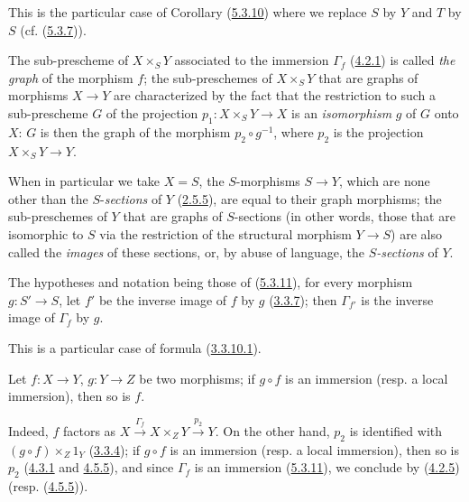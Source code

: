 This is the particular case of Corollary (\hyperref[I.5.3.10]{5.3.10})
where we replace $S$ by $Y$ and $T$ by $S$
(cf. (\hyperref[I.5.3.7]{5.3.7})).

The sub-prescheme of $X\times_S Y$ associated to the immersion $\Gamma_f$
(\hyperref[I.4.2.1]{4.2.1}) is called \emph{the graph} of the morphism $f$;
the sub-preschemes of $X\times_S Y$ that are graphs of morphisms
$X\to Y$ are characterized by the fact that the restriction to such a
sub-prescheme $G$ of the projection $p_1:X\times_S Y\to X$ is an
\emph{isomorphism} $g$ of $G$ onto $X$: $G$ is then the graph of the morphism
$p_2\circ g^{-1}$, where $p_2$ is the projection $X\times_S Y\to Y$.

When in particular we take $X=S$, the $S$-morphisms $S\to Y$, which are
none other than the $S$-\emph{sections} of $Y$ (\hyperref[I.2.5.5]{2.5.5}), are
equal to their graph morphisms; the sub-preschemes of $Y$ that are
graphs of $S$-sections (in other words, those that are isomorphic to $S$ via
the restriction of the structural morphism $Y\to S$) are also called the
\emph{images} of these sections, or, by abuse of language, the
\emph{$S$-sections} of $Y$.

\begin{corollary}[5.3.12]
\label{I.5.3.12}
The hypotheses and notation being those of
\textup{(\hyperref[I.5.3.11]{5.3.11})}, for every morphism $g:S'\to S$, let $f'$
be the inverse image of $f$ by $g$ \textup{(\hyperref[I.3.3.7]{3.3.7})}; then
$\Gamma_{f'}$ is the inverse image of $\Gamma_f$ by $g$.
\end{corollary}

This is a particular case of formula
(\hyperref[I.3.3.10.1]{3.3.10.1}).

\begin{corollary}[5.3.13]
\label{I.5.3.13}
Let $f:X\to Y$, $g:Y\to Z$ be two morphisms; if $g\circ f$ is an
immersion (\textup{resp.} a local immersion), then so is $f$.
\end{corollary}

Indeed, $f$ factors as $X\xrightarrow{\Gamma_f}X\times_Z Y\xrightarrow{p_2}Y$.
On the other hand, $p_2$ is identified with $(g\circ f)\times_Z 1_Y$
(\hyperref[I.3.3.4]{3.3.4}); if $g\circ f$ is an immersion (resp. a
local immersion), then so is $p_2$
(\hyperref[I.4.3.1]{4.3.1} and \hyperref[I.4.5.5]{4.5.5}), and since
$\Gamma_f$ is an immersion (\hyperref[I.5.3.11]{5.3.11}), we conclude
by (\hyperref[I.4.2.5]{4.2.5}) (resp.
(\hyperref[I.4.5.5]{4.5.5})).

